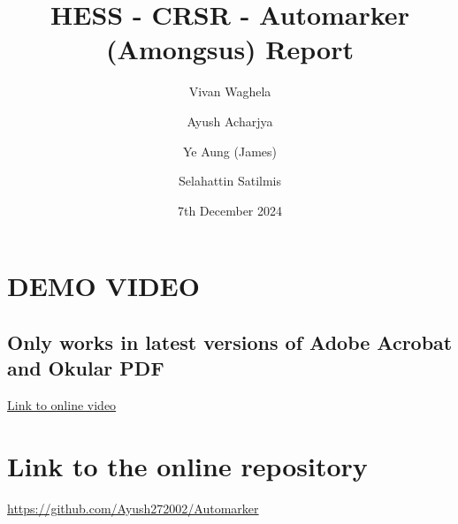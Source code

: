 \documentclass[a4paper, 12pt]{article}
\begin{document}
\title{HESS - CRSR - Automarker (Amongsus) Report}
\author{Vivan Waghela \and Ayush Acharjya \and Ye Aung (James) \and Selahattin Satilmis}
\date{7th December 2024}
\maketitle

\section*{DEMO VIDEO}
\subsection*{Only works in latest versions of Adobe Acrobat and Okular PDF}
\noindent\href{https://bham-my.sharepoint.com/personal/axa2204_student_bham_ac_uk/_layouts/15/guestaccess.aspx?share=ETttWhWBaN5Cg4imyyt9B0sBOtxlj_SgOvyaVzMR3Kuz4g&nav=eyJyZWZlcnJhbEluZm8iOnsicmVmZXJyYWxBcHAiOiJPbmVEcml2ZUZvckJ1c2luZXNzIiwicmVmZXJyYWxBcHBQbGF0Zm9ybSI6IldlYiIsInJlZmVycmFsTW9kZSI6InZpZXciLCJyZWZlcnJhbFZpZXciOiJNeUZpbGVzTGlua0NvcHkifX0&e=0tRqZy}{Link to online video}

\vspace{3mm}

\noindent{}

\section*{Link to the online repository}
\noindent\url{https://github.com/Ayush272002/Automarker}
\end{document}
